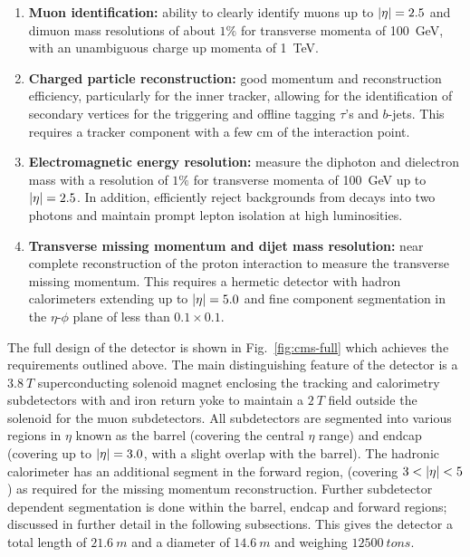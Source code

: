 \begin{enumerate}
    \item \textbf{Muon identification:} ability to clearly identify muons up to
    $|\eta|=2.5$ and dimuon mass resolutions of about $1\%$ for transverse
    momenta of \SI{100}{GeV}, with an unambiguous charge up momenta of
    \SI{1}{TeV}.
    \item \textbf{Charged particle reconstruction:} good momentum and
    reconstruction efficiency, particularly for the inner tracker, allowing
    for the identification of secondary vertices for the triggering and
    offline tagging $\tau$'s and $b$-jets. This requires a tracker component
    with a few cm of the interaction point.
    \item \textbf{Electromagnetic energy resolution:} measure the diphoton and
    dielectron mass with a resolution of $1\%$ for transverse momenta of
    \SI{100}{GeV} up to $|\eta|=2.5$. In addition, efficiently reject backgrounds
    from \Ppizero decays into two photons and maintain prompt lepton isolation
    at high luminosities.
    \item \textbf{Transverse missing momentum and dijet mass resolution:} near
    complete reconstruction of the proton interaction to measure the
    transverse missing momentum. This requires a hermetic detector with hadron
    calorimeters extending up to $|\eta|=5.0$ and fine component segmentation
    in the $\eta$-$\phi$ plane of less than $0.1\times 0.1$.
\end{enumerate}

The full design of the \CMS detector is shown in Fig.~\ref{fig:cms-full} which
achieves the requirements outlined above. The main distinguishing feature of
the \CMS detector is a ${\SI{3.8}{T}}$ superconducting solenoid magnet
enclosing the tracking and calorimetry subdetectors with and iron return yoke
to maintain a ${\SI{2}{T}}$ field outside the solenoid for the muon
subdetectors. All subdetectors are segmented into various regions in $\eta$
known as the barrel (covering the central $\eta$ range) and endcap (covering
up to $|\eta|=3.0$, with a slight overlap with the barrel). The hadronic
calorimeter has an additional segment in the forward region, (covering
$3<\aeta<5$) as required for the missing momentum reconstruction. Further
subdetector dependent segmentation is done within the barrel, endcap and
forward regions; discussed in further detail in the following subsections.
This gives the \CMS detector a total length of ${\SI{21.6}{m}}$ and a diameter
of ${\SI{14.6}{m}}$ and weighing ${\SI{12500}{tons}}$.

